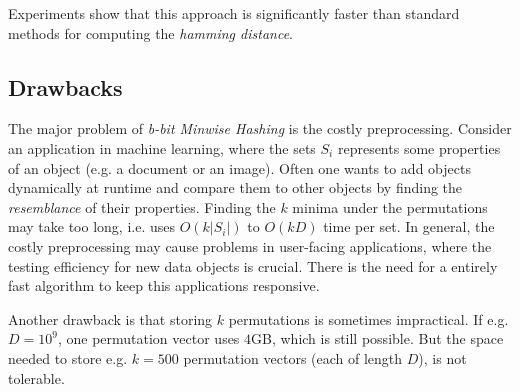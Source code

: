 \documentclass[a4paper]{article}
\begin{document}
Experiments show that this approach is significantly faster than standard methods for computing the \emph{hamming distance}.

\subsection{Drawbacks}

The major problem of \emph{b-bit Minwise Hashing} is the costly preprocessing. Consider an application in machine learning, where the sets $S_i$ represents some properties of an object (e.g. a document or an image). Often one wants to add objects dynamically at runtime and compare them to other objects by finding the \emph{resemblance} of their properties. Finding the $k$ minima under the permutations may take too long, i.e. uses $O(k|S_i|)$ to $O(kD)$ time per set.
In general, the costly preprocessing may cause problems in user-facing applications, where the testing efficiency for new data objects is crucial. There is the need for a entirely fast algorithm to keep this applications responsive.

Another drawback is that storing $k$ permutations is sometimes impractical. If e.g. $D=10^9$, one permutation vector uses $4$GB, which is still possible. But the space needed to store e.g. $k=500$ permutation vectors (each of length $D$), is not tolerable.
\end{document}
